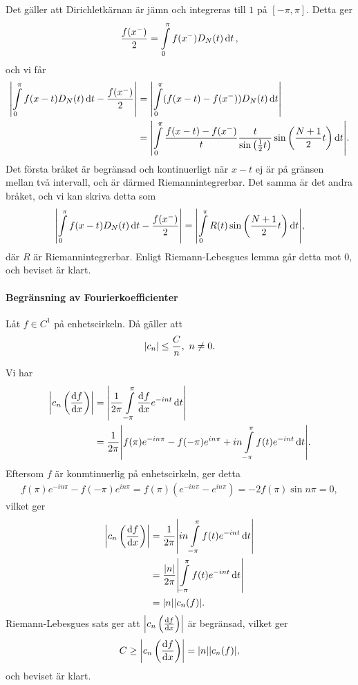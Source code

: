 Det gäller att Dirichletkärnan är jämn och integreras till $1$ på $[-\pi, \pi]$. Detta ger
\begin{align*}
	\frac{f(x^{-})}{2} = \int\limits_{0}^{\pi}f(x^{-})D_{N}(t)\dd{t},
\end{align*}
och vi får
\begin{align*}
	\abs{\int\limits_{0}^{\pi}f(x - t)D_{N}(t)\dd{t} - \frac{f(x^{-})}{2}} &= \abs{\int\limits_{0}^{\pi}(f(x - t) - f(x^{-}))D_{N}(t)\dd{t}} \\
	                                                                 &= \abs{\int\limits_{0}^{\pi}\frac{f(x - t) - f(x^{-})}{t}\frac{t}{\sin{\left(\frac{1}{2}t\right)}}\sin{\left(\frac{N + 1}{2}t\right)}\dd{t}}.
\end{align*}
Det första bråket är begränsad och kontinuerligt när $x - t$ ej är på gränsen mellan två intervall, och är därmed Riemannintegrerbar. Det samma är det andra bråket, och vi kan skriva detta som
\begin{align*}
	\abs{\int\limits_{0}^{\pi}f(x - t)D_{N}(t)\dd{t} - \frac{f(x^{-})}{2}} = \abs{\int\limits_{0}^{\pi}R(t)\sin{\left(\frac{N + 1}{2}t\right)}\dd{t}},
\end{align*}
där $R$ är Riemannintegrerbar. Enligt Riemann-Lebesgues lemma går detta mot $0$, och beviset är klart.

\paragraph{Begränsning av Fourierkoefficienter}
Låt $f\in C^{1}$ på enhetscirkeln. Då gäller att
\begin{align*}
	\abs{c_{n}} \leq \frac{C}{n},\ n \neq 0.
\end{align*}

\proof
Vi har
\begin{align*}
	\abs{c_{n}\left(\dv{f}{x}\right)} &= \abs{\frac{1}{2\pi}\int\limits_{-\pi}^{\pi}\dv[]{f}{x} (t)e^{-int}\dd{t}} \\
	                                  &= \frac{1}{2\pi}\abs{f(\pi)e^{-in\pi} - f(-\pi)e^{in\pi} + in\int\limits_{-\pi}^{\pi}f(t)e^{-int}\dd{t}}.
\end{align*}
Eftersom $f$ är konmtinuerlig på enhetscirkeln, ger detta
\begin{align*}
	f(\pi)e^{-in\pi} - f(-\pi)e^{in\pi} = f(\pi)(e^{-in\pi} - e^{in\pi}) = -2f(\pi)\sin{n\pi} = 0,
\end{align*}
vilket ger
\begin{align*}
	\abs{c_{n}\left(\dv{f}{x}\right)} &= \frac{1}{2\pi}\abs{in\int\limits_{-\pi}^{\pi}f(t)e^{-int}\dd{t}} \\
	                                  &= \frac{\abs{n}}{2\pi}\abs{\int\limits_{-\pi}^{\pi}f(t)e^{-int}\dd{t}} \\
	                                  &= \abs{n}\abs{c_{n}(f)}.
\end{align*}
Riemann-Lebesgues sats ger att $\abs{c_{n}\left(\dv{f}{x}\right)}$ är begränsad, vilket ger
\begin{align*}
	C \geq \abs{c_{n}\left(\dv{f}{x}\right)} = \abs{n}\abs{c_{n}(f)},
\end{align*}
och beviset är klart.

